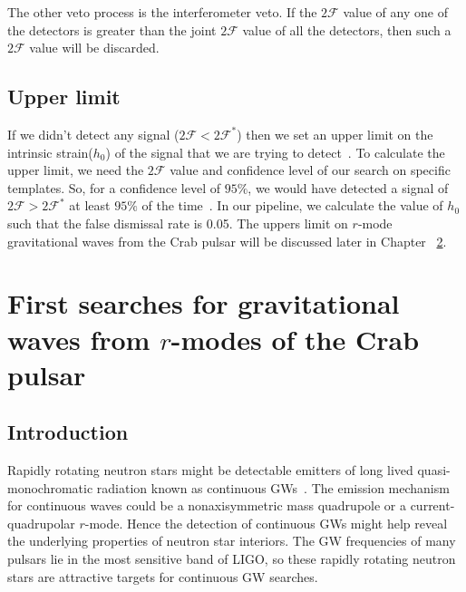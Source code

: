 \documentclass{ttuthes2007}
\begin{document}
The other veto process is the interferometer veto. If the $2\mathcal{F}$ value
of any one of the detectors is greater than the joint $2\mathcal{F}$ value of
all the detectors, then such a $2\mathcal{F}$ value will be discarded. 

\section{Upper limit}
If we didn't detect any signal ($2\mathcal{F}<2\mathcal{F}^*$) then we set an
upper limit on the intrinsic strain($h_0$) of the signal that we are trying to
detect~\cite{Romano_2017}. To calculate the upper limit, we need the
$2\mathcal{F}$ value and confidence level of our search on specific templates. 
So, for a confidence level of $95\%$, we would have detected a signal of
$2\mathcal{F}>2\mathcal{F}^*$ at least $95\%$ of the time~\cite{Romano_2017}. In
our pipeline, we calculate the value of $h_0$ such that the false dismissal rate
is 0.05.
The uppers limit on $r$-mode gravitational waves from the Crab pulsar will be
discussed later in Chapter ~\ref{chapter:6}.

\chapter{\textbf{First searches for gravitational waves from $r$-modes of the
Crab pulsar}}\label{chapter:6}

\section{Introduction}

Rapidly rotating neutron stars might be detectable emitters of long lived
quasi-monochromatic radiation known as continuous
\acp{GW}~\cite{Glampedakis2018}. The emission mechanism for continuous waves
could be a nonaxisymmetric mass quadrupole or a current-quadrupolar $r$-mode.
Hence the detection of continuous \acp{GW} might help reveal the underlying
properties of neutron star interiors. The \ac{GW} frequencies of many pulsars
lie in the most sensitive band of \ac{LIGO}, so these rapidly rotating
neutron stars are attractive targets for continuous \ac{GW} searches.
\end{document}
